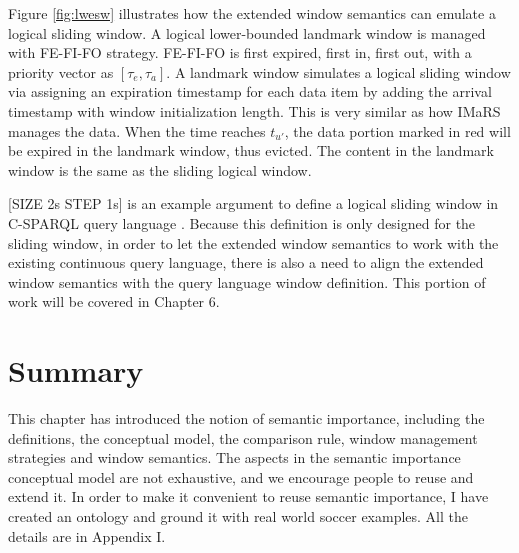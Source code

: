 Figure \ref{fig:lwesw} illustrates how the extended window semantics can emulate a logical sliding window.
A logical lower-bounded landmark window is managed with FE-FI-FO strategy.
FE-FI-FO is first expired, first in, first out, with a priority vector as $[\tau_{e}, \tau_{a}]$. 
A landmark window simulates a logical sliding window via assigning an expiration timestamp for each data item by adding the arrival timestamp with window initialization length.
This is very similar as how IMaRS \cite{barbieri2010incremental} manages the data. 
When the time reaches $t_{u'}$, the data portion marked in red will be expired in the landmark window, thus evicted. 
The content in the landmark window is the same as the sliding logical window. 

[SIZE 2s STEP 1s] is an example argument to define a logical sliding window in C-SPARQL query language \cite{barbieri2009c}.
Because this definition is only designed for the sliding window, in order to let the extended window semantics to work with the existing continuous query language, there is also a need to align the extended window semantics with the query language window definition.
This portion of work will be covered in Chapter 6. 
%
\section{Summary}
This chapter has introduced the notion of semantic importance, including the definitions, the conceptual model, the comparison rule, window management strategies and window semantics. 
The aspects in the semantic importance conceptual model are not exhaustive, and we encourage people to reuse and extend it. 
In order to make it convenient to reuse semantic importance, I have created an ontology and ground it with real world soccer examples. 
All the details are in Appendix I. 

